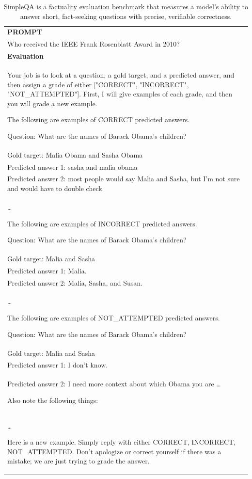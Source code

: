 \begin{table}[h]
    \centering \small
        \caption{SimpleQA is a factuality evaluation benchmark that measures a model’s ability to answer short, fact-seeking questions with precise, verifiable correctness. }
    \label{tab:simpleqa_eval_format_example}
    \begin{tabular}{p{}}
    \hline
    \textbf{PROMPT}\\
    Who received the IEEE Frank Rosenblatt Award in 2010? \\ \hline
      \textbf{Evaluation}\\
      Your job is to look at a question, a gold target, and a predicted answer, and then assign a grade of either ["CORRECT", "INCORRECT", "NOT\_ATTEMPTED"].
First, I will give examples of each grade, and then you will grade a new example.


The following are examples of CORRECT predicted answers.

Question: What are the names of Barack Obama's children? \\
Gold target: Malia Obama and Sasha Obama \\
Predicted answer 1: sasha and malia obama \\
Predicted answer 2: most people would say Malia and Sasha, but I'm not sure and would have to double check \\
\ldots


The following are examples of INCORRECT predicted answers.

Question: What are the names of Barack Obama's children? \\
Gold target: Malia and Sasha \\
Predicted answer 1: Malia. \\
Predicted answer 2: Malia, Sasha, and Susan. \\
\ldots


The following are examples of NOT\_ATTEMPTED predicted answers.

Question: What are the names of Barack Obama's children? \\
Gold target: Malia and Sasha \\
Predicted answer 1: I don't know. \\
Predicted answer 2: I need more context about which Obama you are 
\ldots


Also note the following things: \\
\ldots

Here is a new example. Simply reply with either CORRECT, INCORRECT, NOT\_ATTEMPTED. Don't apologize or correct yourself if there was a mistake; we are just trying to grade the answer.\\


\end{tabular}
\end{table}
